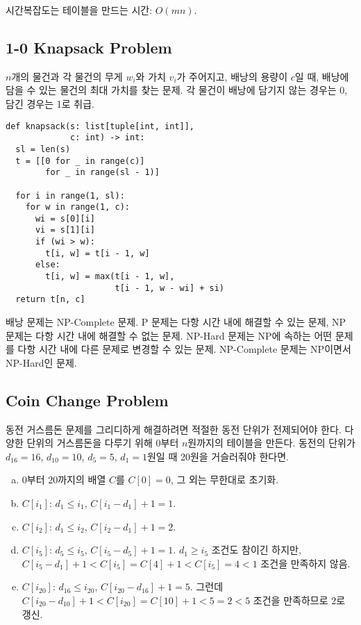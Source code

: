 시간복잡도는 테이블을 만드는 시간: $O(mn)$.

\subsection{1-0 Knapsack Problem}

$n$개의 물건과 각 물건의 무게 $w_i$와 가치 $v_i$가 주어지고, 배낭의 용량이 $c$일 때, 배낭에 담을 수 있는 물건의 최대 가치를 찾는 문제. 각 물건이 배낭에 담기지 않는 경우는 0, 담긴 경우는 1로 취급.

\begin{verbatim}
def knapsack(s: list[tuple[int, int]],
             c: int) -> int:
  sl = len(s)
  t = [[0 for _ in range(c)]
        for _ in range(sl - 1)]

  for i in range(1, sl):
    for w in range(1, c):
      wi = s[0][i]
      vi = s[1][i]
      if (wi > w):
        t[i, w] = t[i - 1, w]
      else:
        t[i, w] = max(t[i - 1, w],
                      t[i - 1, w - wi] + si)
  return t[n, c]
\end{verbatim}

배낭 문제는 NP-Complete 문제. P 문제는 다항 시간 내에 해결할 수 있는 문제, NP 문제는 다항 시간 내에 해결할 수 없는 문제. NP-Hard 문제는 NP에 속하는 어떤 문제를 다항 시간 내에 다른 문제로 변경할 수 있는 문제. NP-Complete 문제는 NP이면서 NP-Hard인 문제.

\subsection{Coin Change Problem}

동전 거스름돈 문제를 그리디하게 해결하려면 적절한 동전 단위가 전제되어야 한다. 다양한 단위의 거스름돈을 다루기 위해 $0$부터 $n$원까지의 테이블을 만든다. 동전의 단위가 $d_{16} = 16$, $d_{10} = 10$, $d_5 = 5$, $d_1 = 1$원일 때 20원을 거슬러줘야 한다면.

\begin{enumerate}[(a)]
  \item $0$부터 $20$까지의 배열 $C$를 $C[0] = 0$, 그 외는 무한대로 초기화.
  \item $C[i_1]$: $d_1 \leq i_1$, $C[i_1 - d_1] + 1 = 1$.
  \item $C[i_2]$: $d_1 \leq i_2$, $C[i_2 - d_1] + 1 = 2$.
  \item $C[i_5]$: $d_5 \leq i_5$, $C[i_5 - d_5] + 1 = 1$. $d_1 \geq i_5$ 조건도 참이긴 하지만, $C[i_5 - d_1] + 1 < C[i_5] = C[4] + 1 < C[i_5] = 4 < 1$ 조건을 만족하지 않음.
  \item $C[i_{20}]$: $d_{16} \leq i_{20}$, $C[i_{20} - d_{16}] + 1 = 5$. 그런데 $C[i_{20} - d_{10}] + 1 < C[i_{20}] = C[10] + 1 < 5 = 2 < 5$ 조건을 만족하므로 $2$로 갱신.
\end{enumerate}
